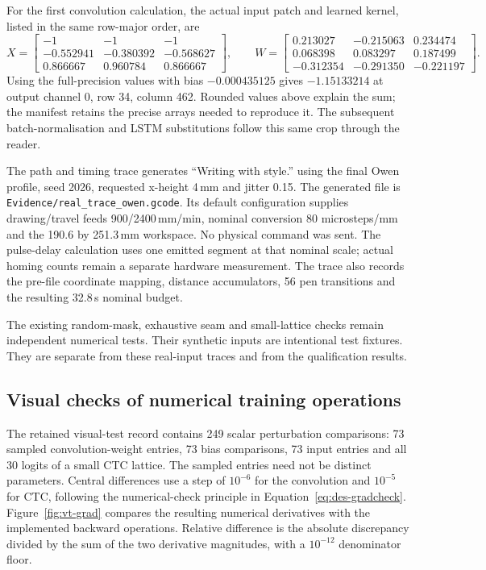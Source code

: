 For the first convolution calculation, the actual input patch and learned kernel, listed in the same row-major order, are
\[
X=\begin{bmatrix}-1&-1&-1\\-0.552941&-0.380392&-0.568627\\0.866667&0.960784&0.866667\end{bmatrix},\qquad
W=\begin{bmatrix}0.213027&-0.215063&0.234474\\0.068398&0.083297&0.187499\\-0.312354&-0.291350&-0.221197\end{bmatrix}.
\]
Using the full-precision values with bias $-0.000435125$ gives $-1.15133214$ at output channel 0, row 34, column 462. Rounded values above explain the sum; the manifest retains the precise arrays needed to reproduce it. The subsequent batch-normalisation and LSTM substitutions follow this same crop through the reader.

The path and timing trace generates ``Writing with style.'' using the final Owen profile, seed 2026, requested x-height 4\,mm and jitter 0.15. The generated file is \texttt{Evidence/real\_trace\_owen.gcode}. Its default configuration supplies drawing/travel feeds 900/2400\,mm/min, nominal conversion 80 microsteps/mm and the 190.6 by 251.3\,mm workspace. No physical command was sent. The pulse-delay calculation uses one emitted segment at that nominal scale; actual homing counts remain a separate hardware measurement. The trace also records the pre-file coordinate mapping, distance accumulators, 56 pen transitions and the resulting 32.8\,s nominal budget.

The existing random-mask, exhaustive seam and small-lattice checks remain independent numerical tests. Their synthetic inputs are intentional test fixtures. They are separate from these real-input traces and from the qualification results.

\clearpage
\subsection{Visual checks of numerical training operations}\label{app:vt-gradient}
The retained visual-test record contains 249 scalar perturbation comparisons: 73 sampled convolution-weight entries, 73 bias comparisons, 73 input entries and all 30 logits of a small CTC lattice. The sampled entries need not be distinct parameters. Central differences use a step of $10^{-6}$ for the convolution and $10^{-5}$ for CTC, following the numerical-check principle in Equation~\ref{eq:des-gradcheck}. Figure~\ref{fig:vt-grad} compares the resulting numerical derivatives with the implemented backward operations. Relative difference is the absolute discrepancy divided by the sum of the two derivative magnitudes, with a $10^{-12}$ denominator floor.

